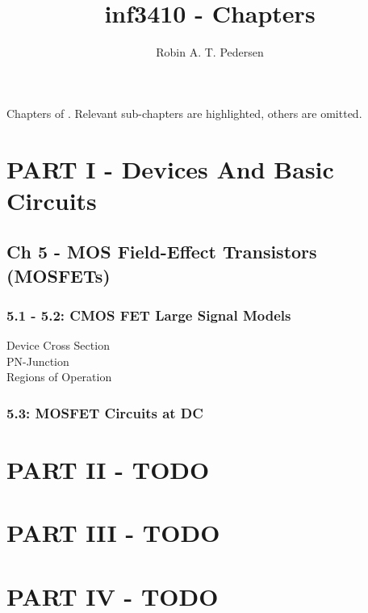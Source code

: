 \documentclass[twocolumn]{article}
\begin{document}
  \title{inf3410 - Chapters}
  \author{Robin A. T. Pedersen}
  \maketitle

  Chapters of \book.
  Relevant sub-chapters are highlighted, others are omitted.

  \section{PART I - Devices And Basic Circuits}
    \subsection{Ch 5 - MOS Field-Effect Transistors (MOSFETs)}
      \subsubsection{5.1 - 5.2: CMOS FET Large Signal Models}
        Device Cross Section \\
        PN-Junction \\
        Regions of Operation
      \subsubsection{5.3: MOSFET Circuits at DC}
  \section{PART II - TODO}
  \section{PART III - TODO}
  \section{PART IV - TODO}
\end{document}
